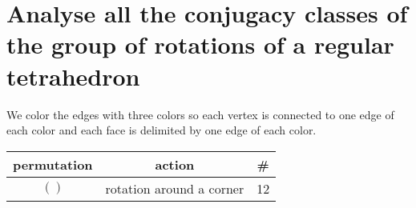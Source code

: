 \documentclass[11pt]{article}
\begin{document}
    \part*{Analyse all the conjugacy classes of the group of rotations of a regular tetrahedron}

    We color the edges with three colors so each vertex is connected to one edge of each color and each face is delimited by one edge of each color.



    \begin{tabular}{|c|c|c|}
        \hline
        \textbf{permutation} & \textbf{action} & \textbf{\#} \\
        \hline
        $()$ & rotation around a corner & 12 \\
        \hline
    \end{tabular}
    
\end{document}
